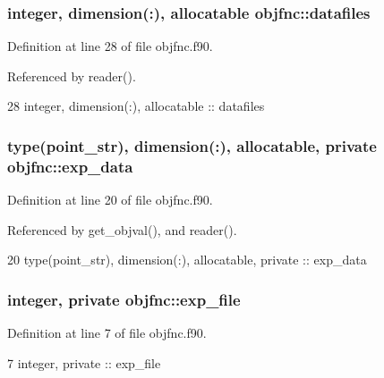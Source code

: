 \subsubsection[{datafiles}]{\setlength{\rightskip}{0pt plus 5cm}integer, dimension(\+:), allocatable objfnc\+::datafiles}\label{namespaceobjfnc_aa04790f1deb9667d535af168d202ae35}


Definition at line 28 of file objfnc.\+f90.



Referenced by reader().


\begin{DoxyCode}
28   \textcolor{keywordtype}{integer}, \textcolor{keywordtype}{dimension(:)}, \textcolor{keywordtype}{allocatable} :: datafiles
\end{DoxyCode}
\subsubsection[{exp\+\_\+data}]{\setlength{\rightskip}{0pt plus 5cm}type({\bf point\+\_\+str}), dimension(\+:), allocatable, private objfnc\+::exp\+\_\+data\hspace{0.3cm}{\ttfamily [private]}}\label{namespaceobjfnc_aa0f23751e770ce7a6dc79a3bbb6bd2cb}


Definition at line 20 of file objfnc.\+f90.



Referenced by get\+\_\+objval(), and reader().


\begin{DoxyCode}
20   \textcolor{keywordtype}{type}(point\_str), \textcolor{keywordtype}{dimension(:)}, \textcolor{keywordtype}{allocatable}, \textcolor{keywordtype}{private} :: exp\_data
\end{DoxyCode}
\subsubsection[{exp\+\_\+file}]{\setlength{\rightskip}{0pt plus 5cm}integer, private objfnc\+::exp\+\_\+file\hspace{0.3cm}{\ttfamily [private]}}\label{namespaceobjfnc_a7b8adf7e1a2f8fd5143d33f41f208c00}


Definition at line 7 of file objfnc.\+f90.


\begin{DoxyCode}
7   \textcolor{keywordtype}{integer}, \textcolor{keywordtype}{private} :: exp\_file
\end{DoxyCode}
